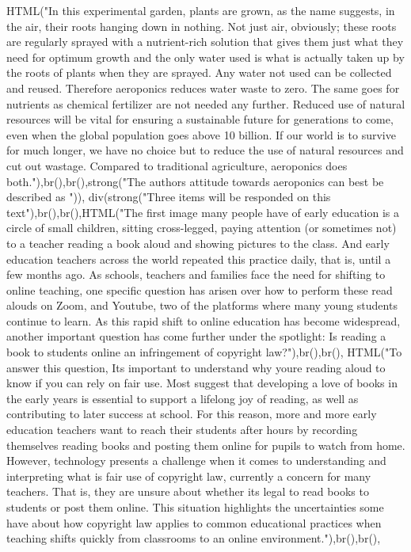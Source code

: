 \documentclass[
]{article}
\newenvironment{Shaded}{\begin{snugshade}}{\end{snugshade}}
\newcommand{\FunctionTok}[1]{\textcolor[rgb]{0.00,0.00,0.00}{#1}}
\newcommand{\NormalTok}[1]{#1}
\newcommand{\StringTok}[1]{\textcolor[rgb]{0.31,0.60,0.02}{#1}}
\begin{document}
\begin{Shaded}
\begin{Highlighting}[]
               \FunctionTok{HTML}\NormalTok{(}\StringTok{"In this experimental garden, plants are grown, as the name suggests, in the air, their roots hanging down in nothing. Not just air, obviously; these roots are regularly sprayed with a nutrient{-}rich solution that gives them just what they need for optimum growth and the only water used is what is actually taken up by the roots of plants when they are sprayed. Any water not used can be collected and reused. Therefore aeroponics reduces water waste to zero. The same goes for nutrients as chemical fertilizer are not needed any further. Reduced use of natural resources will be vital for ensuring a sustainable future for generations to come, even when the global population goes above 10 billion. If our world is to survive for much longer, we have no choice but to reduce the use of natural resources and cut out wastage.  Compared to traditional agriculture, aeroponics does both."}\NormalTok{),}\FunctionTok{br}\NormalTok{(),}\FunctionTok{br}\NormalTok{(),}\FunctionTok{strong}\NormalTok{(}\StringTok{"The authors attitude towards aeroponics can best be described as "}\NormalTok{)),}
           \FunctionTok{div}\NormalTok{(}\FunctionTok{strong}\NormalTok{(}\StringTok{"Three items will be responded on this text"}\NormalTok{),}\FunctionTok{br}\NormalTok{(),}\FunctionTok{br}\NormalTok{(),}\FunctionTok{HTML}\NormalTok{(}\StringTok{"The first image many people have of early education is a circle of small children, sitting cross{-}legged, paying attention (or sometimes not) to a teacher reading a book aloud and showing pictures to the class. And early education teachers across the world repeated this practice daily, that is, until a few months ago. As schools, teachers and families face the need for shifting to online teaching, one  specific question has arisen over how to perform these read alouds on Zoom, and Youtube, two of the platforms where many young students continue to learn. As this rapid shift to online education has become widespread, another important question has come further under the spotlight: Is reading a book to students online an infringement of copyright law?"}\NormalTok{),}\FunctionTok{br}\NormalTok{(),}\FunctionTok{br}\NormalTok{(), }
               \FunctionTok{HTML}\NormalTok{(}\StringTok{"To answer this question, Its important to understand why youre reading aloud to know if you can rely on fair use. Most suggest that developing a love of books in the early years is essential to support a lifelong joy of reading, as well as contributing to later success at school. For this reason, more and more early education teachers want to reach their students after hours by recording themselves reading books and posting them online for pupils to watch from home. However, technology presents a challenge when it comes to understanding and interpreting what is fair use of copyright law, currently a concern for many teachers. That is, they are unsure about whether its legal to read books to students or post them online. This situation highlights the uncertainties some have about how copyright law applies to common educational practices when teaching shifts quickly from classrooms to an online environment."}\NormalTok{),}\FunctionTok{br}\NormalTok{(),}\FunctionTok{br}\NormalTok{(), }

\end{Highlighting}
\end{Shaded}
\end{document}
